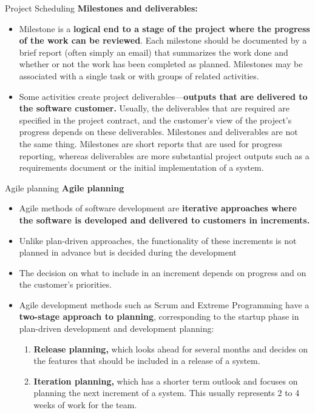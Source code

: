 \documentclass{beamer}
\begin{document}
\begin{frame}{Project Scheduling}
	\textbf{Milestones and deliverables: }
	\begin{itemize}
		\item Milestone is a \textbf{logical end to a stage of the project where the progress of the work can be reviewed}. 
		Each milestone should be documented by a brief report (often simply an email) that summarizes the 
		work done and whether or not the work has been completed as planned. Milestones may be 
		associated with a single task or with groups of related activities.
		\item Some activities create project deliverables—\textbf{outputs that are delivered to the software customer. }
		Usually, the deliverables that are required are specified in the project contract, and the customer’s 
		view of the project’s progress depends on these deliverables. Milestones and deliverables are not the 
		same thing. Milestones are short reports that are used for progress reporting, whereas deliverables are 
		more substantial project outputs such as a requirements document or the initial implementation of a 
		system.
	\end{itemize}
\end{frame}
\begin{frame}{Agile planning}
\textbf{Agile planning}
\begin{itemize}
	\item Agile methods of software development are \textbf{iterative approaches where the software is developed and 
		delivered to customers in increments.}
	\item Unlike plan-driven approaches, the functionality of these increments is not planned in advance but is 
	decided during the development
	\item The decision on what to include in an increment depends on progress and on the customer’s priorities. 
	\item Agile development methods such as Scrum  and Extreme Programming  have a \textbf{two-stage approach to planning}, corresponding to the startup phase in plan-driven development and development planning:
	\begin{enumerate}
		\item \textbf{Release planning,} which looks ahead for several months and decides on the features that should be included in a release of a system.
			\item \textbf{Iteration planning,} which has a shorter term outlook and focuses on planning the next increment of a system. This usually represents 2 to 4 weeks of work for the team.
	\end{enumerate}
\end{itemize}
\end{frame}
\end{document}
